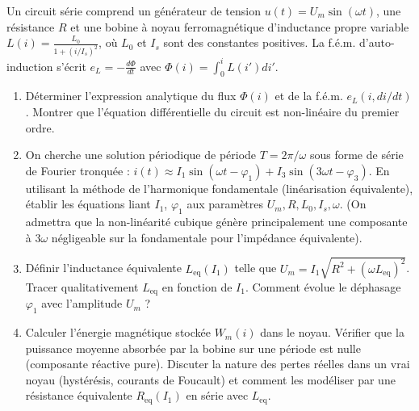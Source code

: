 \documentclass[11pt]{article}
\begin{document}
\begin{exercice}
Un circuit série comprend un générateur de tension $u(t) = U_m \sin(\omega t)$, une résistance $R$ et une bobine à noyau ferromagnétique d'inductance propre variable $L(i) = \frac{L_0}{1 + (i/I_s)^2}$, où $L_0$ et $I_s$ sont des constantes positives. La f.é.m. d'auto-induction s'écrit $e_L = - \frac{d\Phi}{dt}$ avec $\Phi(i) = \int_0^i L(i') di'$.
\begin{enumerate}
    \item Déterminer l'expression analytique du flux $\Phi(i)$ et de la f.é.m. $e_L(i, di/dt)$. Montrer que l'équation différentielle du circuit est non-linéaire du premier ordre.
    \item On cherche une solution périodique de période $T = 2\pi/\omega$ sous forme de série de Fourier tronquée : $i(t) \approx I_1 \sin(\omega t - \varphi_1) + I_3 \sin(3\omega t - \varphi_3)$. En utilisant la méthode de l'harmonique fondamentale (linéarisation équivalente), établir les équations liant $I_1$, $\varphi_1$ aux paramètres $U_m, R, L_0, I_s, \omega$. (On admettra que la non-linéarité cubique génère principalement une composante à $3\omega$ négligeable sur la fondamentale pour l'impédance équivalente).
    \item Définir l'inductance équivalente $L_{\text{eq}}(I_1)$ telle que $U_m = I_1 \sqrt{R^2 + (\omega L_{\text{eq}})^2}$. Tracer qualitativement $L_{\text{eq}}$ en fonction de $I_1$. Comment évolue le déphasage $\varphi_1$ avec l'amplitude $U_m$ ?
    \item Calculer l'énergie magnétique stockée $W_m(i)$ dans le noyau. Vérifier que la puissance moyenne absorbée par la bobine sur une période est nulle (composante réactive pure). Discuter la nature des pertes réelles dans un vrai noyau (hystérésis, courants de Foucault) et comment les modéliser par une résistance équivalente $R_{\text{eq}}(I_1)$ en série avec $L_{\text{eq}}$.
\end{enumerate}
\end{exercice}
\end{document}

